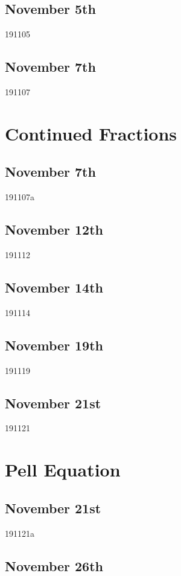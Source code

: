 \subsection{November 5th}
{191105}

\subsection{November 7th}
{191107}

\section{Continued Fractions}
\subsection{November 7th}
{191107a}

\subsection{November 12th}
{191112}

\subsection{November 14th}
{191114}

\subsection{November 19th}
{191119}

\subsection{November 21st}
{191121}

\section{Pell Equation}
\subsection{November 21st}
{191121a}

\subsection{November 26th}



